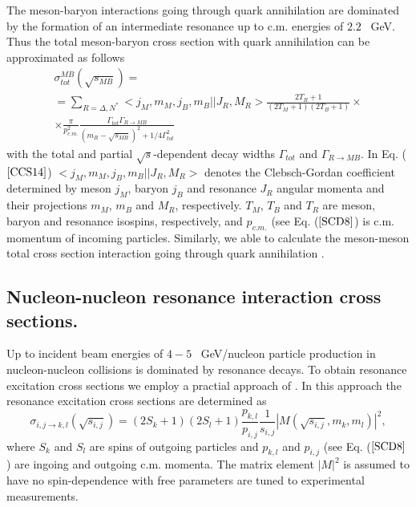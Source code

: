 \hspace{1.0em}
The meson-baryon
interactions going through quark annihilation
 are dominated by the formation of an intermediate
resonance up to c.m. energies of $2.2$ \ GeV. 
 Thus the total meson-baryon cross section with quark annihilation 
 can be approximated as follows \cite{URQMD97}
\begin{equation}
\begin{array}{cc}
\label{CCS14} \sigma^{MB}_{tot}(\sqrt{s_{MB}}) = \\
=\sum_{R=\Delta ,N^{*}}<j_M,m_M,j_B, m_B||J_R,
M_R>\frac{2T_R+1}{(2T_M+1)(2T_B+1)} \times \\
\times \frac{\pi}{p^2_{c.m.}} 
\frac{\Gamma_{tot}\Gamma_{R\rightarrow MB}}
{(m_R - \sqrt{s_{MB}})^2 +1/4\Gamma^2_{tot}}
\end{array}
\end{equation}
with the total and partial $\sqrt{s}$-dependent decay widths
$\Gamma_{tot}$ and $\Gamma_{R\rightarrow MB}$. In Eq. ($\ref{CCS14}$)
$<j_M,m_M,j_B, m_B||J_R,M_R>$ denotes the Clebsch-Gordan coefficient
determined by meson $j_M$, baryon $j_B$ and resonance $J_R$ angular
momenta and their projections $m_M$, $m_B$ and $M_R$,
respectively. $T_M$, $T_B$ and $T_R$ are meson, baryon and resonance
isospins, respectively, and $p_{c.m.}$ (see Eq. ($\ref{SCD8}$) 
is c.m. momentum of incoming 
particles. Similarly, we able to calculate the meson-meson total cross 
section interaction going through quark annihilation \cite{URQMD97}.


\subsection{Nucleon-nucleon resonance interaction cross sections.}

\hspace{1.0em}
Up to incident beam energies of $4-5$ \ GeV/nucleon particle
production in nucleon-nucleon collisions is dominated by resonance decays.  
To obtain resonance excitation cross sections we 
 employ a practial approach of \cite{URQMD97}. 
In this approach the resonance excitation cross sections are
determined as
\begin{equation}
\label{CCS15} \sigma_{i,j\rightarrow k,l}(\sqrt{s_{i,j}}) =
(2S_k + 1)(2S_l
+1)\frac{p_{k,l}}{p_{i,j}}\frac{1}{s_{i,j}}|M(\sqrt{s_{i,j}},m_k,m_l)|^2,
\end{equation}
where $S_k$ and $S_l$ are spins of outgoing particles and 
$p_{k,l}$ and $p_{i,j}$ (see Eq. ($\ref{SCD8}$) 
are ingoing and outgoing c.m. momenta. The matrix
element $|M|^2$ is assumed to have no
spin-dependence with free parameters are tuned \cite{URQMD97} to 
experimental measurements. 

